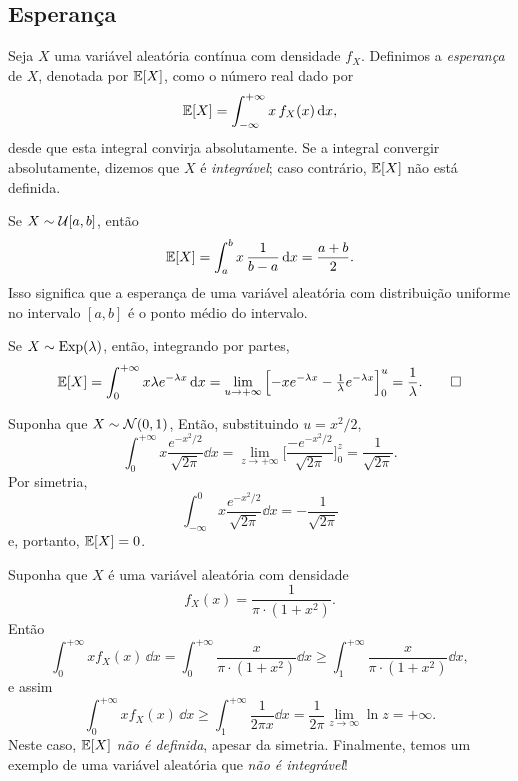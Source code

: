 \subsection{Esperança}

\begin{definition}
[Esperança]
Seja $ X $ uma variável aleatória contínua com densidade $ f_X $.
Definimos a \emph{esperança} de $ X $, denotada por $ \mathbb{E}[X] $, como o número real dado por
\[
\mathbb{E}[X] = \int_{-\infty}^{+\infty} x \, f_X(x) \, \mathrm{d} x
,
\]
desde que esta integral convirja absolutamente.
Se a integral convergir absolutamente, dizemos que $ X $ é \emph{integrável}; caso contrário, $ \mathbb{E}[X] $ não está definida.
\end{definition}

\begin{example}
[Uniforme]
Se $X\sim \mathcal{U}[a,b]$, então
\[
\mathbb{E} [X] = \int_a^b x \, \frac{1}{b-a} \, \mathrm{d} x = \frac{a+b}{2}
.
\]
Isso significa que a esperança de uma variável aleatória com distribuição uniforme no intervalo $ [a,b] $ é o ponto médio do intervalo.
\end{example}

\begin{example}
[Exponencial]
Se $X\sim\mathrm{Exp}(\lambda)$,
então, integrando por partes,
\[
\mathbb{E} [X]
=
\int_0^{+\infty} x \lambda e^{-\lambda x} \, \mathrm{d} x
=
\lim_{u\to{+\infty}}
\Big[
{-x}
e^{-\lambda x}
-
\tfrac{1}{\lambda}
e^{-\lambda x}
\Big]_0^u
=
\frac{1}{\lambda}
.
\qedhere
\]
\end{example}

\begin{example}
[Normal]
Suponha que $X\sim \mathcal{N} (0,1)$,
Então, substituindo $ u=x^2/2 $,
\[
\int_{0}^{+\infty} x \frac{e^{-x^2/2}}{\sqrt{2\pi}}\dd x
=
\lim_{z\to{+\infty}}
\Big[
\frac{-e^{-x^2/2}}{\sqrt{2\pi}}
\Big]_0^z
=
\frac{1}{\sqrt{{2\pi}}}
.
\]
Por simetria,
\[
\int_{-\infty}^0 x \frac{e^{-x^2/2}}{\sqrt{2\pi}}\dd x
=
-\frac{1}{\sqrt{{2\pi}}}
\]
e, portanto, $ \mathbb{E}[X] = 0 $.
\end{example}

\begin{example}
[Cauchy]
Suponha que $ X $ é uma variável aleatória com densidade
\[
f_X(x)=
\frac{1}{\pi\cdot(1+x^2)}
.
\]
Então
\[
\int_{0}^{+\infty} x f_X(x) \, \dd x
=
\int_{0}^{+\infty} \frac{x}{\pi\cdot(1+x^2)} \dd x
\geq
\int_{1}^{+\infty} \frac{x}{\pi\cdot(1+x^2)} \dd x
,
\]
e assim
\[
\int_{0}^{+\infty} x f_X(x) \, \dd x
\geq
\int_{1}^{+\infty} \frac{1}{2 \pi x} \dd x
=
\frac{1}{2\pi}
\lim_{z\to \infty} \ln z
=
+\infty
.
\]
Neste caso, $ \mathbb{E}[X] $ \emph{não é definida}, apesar da simetria.
Finalmente, temos um exemplo de uma variável aleatória que \emph{não é integrável}!
\end{example}

